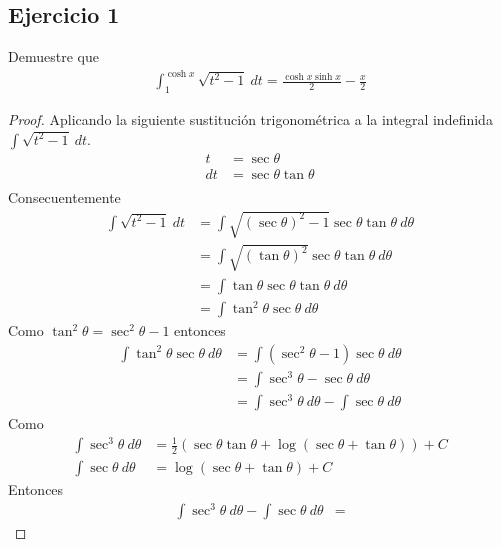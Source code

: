 \documentclass[a4paper]{article}
\begin{document}
\subsection{Ejercicio 1}
\noindent
Demuestre que
\begin{align*}
    \int_{1}^{\cosh{x}} \sqrt{t^2 - 1} \ dt = \frac{\cosh{x}\sinh{x}}{2} - \frac{x}{2}
\end{align*}
\begin{proof}
    Aplicando la siguiente sustitución trigonométrica a la integral indefinida \(\int \sqrt{t^2 - 1} \ dt\).
    \begin{align*}
        t &= \sec{\theta} \\
        dt &= \sec{\theta} \tan{\theta} \\
    \end{align*}
    Consecuentemente 
    \begin{align*}
        \int \sqrt{t^2 - 1} \ dt &= \int \sqrt{\left(\sec{\theta}\right)^2 - 1}\sec{\theta} \tan{\theta} \ d\theta \\
                                 &= \int \sqrt{\left(\tan{\theta}\right)^2}\sec{\theta} \tan{\theta} \ d\theta \\
                                 &= \int \tan{\theta}\sec{\theta} \tan{\theta} \ d\theta \\
                                 &= \int \tan^2{\theta}\sec{\theta} \ d\theta                                 
    \end{align*}
    Como \(\tan^2{\theta} = \sec^{2}{\theta} - 1\) entonces 
    \begin{align*}
        \int \tan^2{\theta}\sec{\theta} \ d\theta &= \int \left(\sec^{2}{\theta} - 1\right)\sec{\theta} \ d\theta \\
                                                  &= \int \sec^{3}{\theta} - \sec{\theta} \ d\theta \\
                                                  &= \int \sec^{3}{\theta} \ d\theta - \int \sec{\theta} \ d\theta
    \end{align*}
    Como
    \begin{align*}
        \int \sec^{3}{\theta} \ d\theta &= \frac{1}{2}\left(\sec{\theta}\tan{\theta} + \log{\left(\sec{\theta} + \tan{\theta}\right)}\right) + C \\
        \int \sec{\theta} \ d\theta &= \log{\left(\sec{\theta} + \tan{\theta}\right)} + C
    \end{align*}
    Entonces 
    \begin{align*}
        \int \sec^{3}{\theta} \ d\theta - \int \sec{\theta} \ d\theta &= 

\end{align*}
\end{proof}
\end{document}
